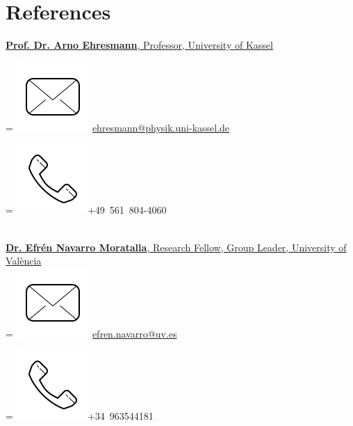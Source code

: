 \section{References} 
\href{http://ag-ehresmann.de/}{\textbf{Prof. Dr. Arno Ehresmann}, Professor, University of Kassel}


\begingroup
{}=\hbox{
\includegraphics[scale=0.1,trim={0 1cm 0cm 0cm}]{icons/main/mail.png}\hspace{0.1cm}
\href{mailto:ehresmann@physik.uni-kassel.de}{ehresmann@physik.uni-kassel.de} 
}
\parbox{\wd0}{}
\endgroup
\begingroup
{}=\hbox{
\includegraphics[scale=0.1,trim={0 1.25cm -0.4cm 0cm}]{icons/main/phone.png}\hspace{0.1cm}+49 561 804-4060
}
\parbox{\wd0}{}\endgroup
\\
\sectionsep
\href{https://www.linkedin.com/in/navarro-moratalla-efrén-1bb1b4a5/?originalSubdomain=es} {\textbf{Dr. Efrén Navarro Moratalla}, Research Fellow, Group Leader, University of València} 
\\
\begingroup
{}=\hbox{
\includegraphics[scale=0.1,trim={0 1cm 0cm 0cm}]{icons/main/mail.png}\hspace{0.1cm}  	\href{mailto:efren.navarro@uv.es}{efren.navarro@uv.es}
}
\parbox{\wd0}{}
\endgroup
\begingroup
{}=\hbox{
\includegraphics[scale=0.1,trim={0 1.25cm -0.4cm 0cm}]{icons/main/phone.png}\hspace{0.1cm}+34 963544181
}

